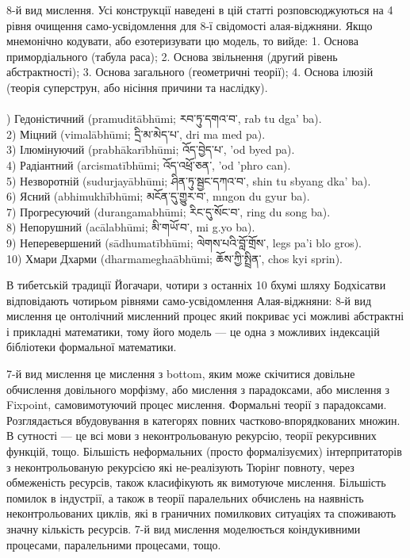 8-й вид мислення. Усі конструкції наведені в цій статті розповсюджуються на 4 рівня
очищення само-усвідомлення для 8-ї свідомості алая-віджняни. Якщо мнемонічно кодувати,
або езотеризувати цю модель, то вийде: 1. Основа примордіального (табула раса);
2. Основа звільнення (другий рівень абстрактності); 3. Основа загального (геометричні теорії);
4. Основа ілюзій (теорія суперструн, або нісіння причини та наслідку).
\\
\\
\footnotesize
{}) Гедоністичний (pramuditābhūmi; \ti རབ་ཏུ་དགའ་བ་,  \ua rab tu dga' ba).\\
2) Міцний (vimalābhūmi; \ti དྲི་མ་མེད་པ་, \ua dri ma med pa).\\
3) Ілюмінуючий (prabhākarībhūmi; \ti འོད་བྱེད་པ་, \ua 'od byed pa).\\
4) Радіантний (arcismatībhūmi; \ti འོད་འཕྲོ་ཅན་, \ua 'od 'phro can).\\
5) Незворотній (sudurjayābhūmi; \ti ཤིན་ཏུ་སྦྱང་དཀའ་བ་, \ua shin tu sbyang dka' ba).\\
6) Ясний (abhimukhībhūmi; \ti མངོན་དུ་གྱུར་བ་, \ua mngon du gyur ba).\\
7) Прогресуючий (durangamabhūmi; \ti རིང་དུ་སོང་བ་, \ua ring du song ba).\\
8) Непорушний (acālabhūmi; \ti མི་གཡོ་བ་, \ua mi g.yo ba).\\
9) Неперевершений (sādhumatībhūmi; \ti ལེགས་པའི་བློ་གྲོས་, \ua legs pa'i blo gros).\\
10) Хмари Дхарми (dharmameghaābhūmi; \ti ཆོས་ཀྱི་སྤྲིན་, \ua chos kyi sprin).\\
\normalsize

В тибетській традиції Йогачари, чотири з останніх 10 бхумі шляху Бодхісатви відповідають
чотирьом рівнями само-усвідомлення Алая-віджняни: 8-й вид мислення це онтолічний мисленний
процес який покриває усі можливі абстрактні і прикладні математики, тому його модель ---
це одна з можливих індексацій бібліотеки формальної математики.

7-й вид мислення це мислення з bottom, яким може скічитися довільне обчислення довільного морфізму,
або мислення з парадоксами, або мислення з Fixpoint, самовимотуючий процес мислення. Формальні
теорії з парадоксами. Розглядається вбудовування в категорях повних частково-впорядкованих множин.
В сутності --- це всі мови з неконтрольованую рекурсію, теорії рекурсивних функцій, тощо.
Більшість неформальних (просто формалізуємих) інтерпритаторів з неконтрольованую рекурсією
які не-реалізують Тюрінг повноту, через обмеженість ресурсів, також класифікують як вимотуюче
мислення. Більшість помилок в індустрії, а також в теорії паралельних обчислень на наявність
неконтрольованих циклів, які в граничних помилкових ситуаціях та споживають значну кількість
ресурсів. 7-й вид мислення моделюється коіндукивними процесами, паралельними процесами, тощо.

